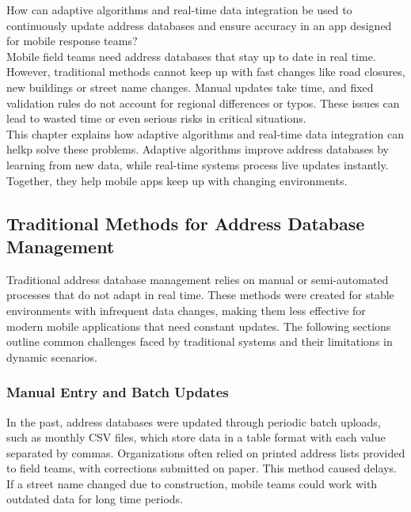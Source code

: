 \Author{\daAuthorOne}

How can adaptive algorithms and real-time data integration be used to continuously update address databases and ensure accuracy in an app designed for mobile response teams?\\

Mobile field teams need address databases that stay up to date in real time. However, traditional methods cannot keep up with fast changes like road closures, new buildings or street name changes. Manual updates take time, and fixed validation rules do not account for regional differences or typos. These issues can lead to wasted time or even serious risks in critical situations.\\

This chapter explains how adaptive algorithms and real-time data integration can helkp solve these problems. Adaptive algorithms improve address databases by learning from new data, while real-time systems process live updates instantly. Together, they help mobile apps keep up with changing environments.



    \subsection{Traditional Methods for Address Database Management}

    Traditional address database management relies on manual or semi-automated processes that do not adapt in real time. These methods were created for stable environments with infrequent data changes, making them less effective for modern mobile applications that need constant updates. The following sections outline common challenges faced by traditional systems and their limitations in dynamic scenarios.

        \subsubsection{Manual Entry and Batch Updates}
        In the past, address databases were updated through periodic batch uploads, such as monthly CSV files, which store data in a table format with each value separated by commas. Organizations often relied on printed address lists provided to field teams, with corrections submitted on paper. This method caused delays. If a street name changed due to construction, mobile teams could work with outdated data for long time periods. \autocite{FasterCapital2025Mar}\\

